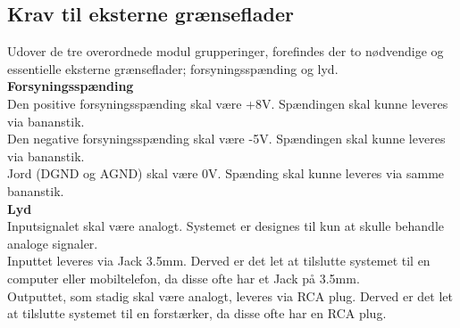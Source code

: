 \subsection{Krav til eksterne grænseflader}
\label{EksterneGraenseflader}
%
Udover de tre overordnede modul grupperinger, forefindes der to nødvendige og essentielle eksterne grænseflader; forsyningsspænding og lyd.\\
\blankline	
\textbf{Forsyningsspænding}\\
Den positive forsyningsspænding skal være +8V. Spændingen skal kunne leveres via bananstik.\\
Den negative forsyningsspænding skal være -5V. Spændingen skal kunne leveres via bananstik.\\
Jord (DGND og AGND) skal være 0V. Spænding skal kunne leveres via samme bananstik.\\ 
\blankline 
\textbf{Lyd}\\
Inputsignalet skal være analogt. Systemet er designes til kun at skulle behandle analoge signaler.\\ 
Inputtet leveres via Jack 3.5mm. Derved er det let at tilslutte systemet til en computer eller mobiltelefon, da disse ofte har et Jack på 3.5mm.\\
Outputtet, som stadig skal være analogt, leveres via RCA plug. Derved er det let at tilslutte systemet til en forstærker, da disse ofte har en RCA plug.\\
%

